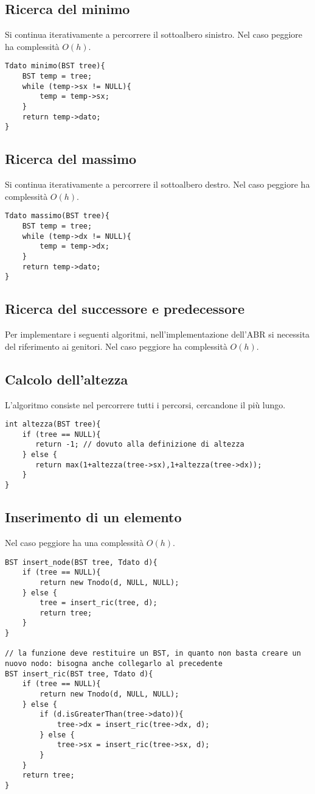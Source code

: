\subsection{Ricerca del minimo}
Si continua iterativamente a percorrere il sottoalbero sinistro. Nel caso peggiore ha complessità $O(h)$.
\begin{lstlisting}[title={Ricerca del minimo in un ABR}]
Tdato minimo(BST tree){
    BST temp = tree;
    while (temp->sx != NULL){
        temp = temp->sx;
    }
    return temp->dato;
}
\end{lstlisting}

\subsection{Ricerca del massimo}
Si continua iterativamente a percorrere il sottoalbero destro. Nel caso peggiore ha complessità $O(h)$.
\begin{lstlisting}[title={Ricerca del massimo in un ABR}]
Tdato massimo(BST tree){
    BST temp = tree;
    while (temp->dx != NULL){
        temp = temp->dx;
    }
    return temp->dato;
}
\end{lstlisting}

\subsection{Ricerca del successore e predecessore}
Per implementare i seguenti algoritmi, nell'implementazione dell'ABR si necessita del riferimento ai genitori. Nel caso peggiore ha complessità $O(h)$.

\subsection{Calcolo dell'altezza}
L'algoritmo consiste nel percorrere tutti i percorsi, cercandone il più lungo.
\begin{lstlisting}[title={Calcolo dell'altezza in un ABR}]
int altezza(BST tree){
    if (tree == NULL){
       return -1; // dovuto alla definizione di altezza
    } else {
       return max(1+altezza(tree->sx),1+altezza(tree->dx));
    }
}
\end{lstlisting}

\subsection{Inserimento di un elemento}
Nel caso peggiore ha una complessità $O(h)$.
\begin{lstlisting}[title={Inserimento di un elemento in un ABR}]
BST insert_node(BST tree, Tdato d){
    if (tree == NULL){
        return new Tnodo(d, NULL, NULL);
    } else {
        tree = insert_ric(tree, d);
        return tree;
    }
}

// la funzione deve restituire un BST, in quanto non basta creare un nuovo nodo: bisogna anche collegarlo al precedente
BST insert_ric(BST tree, Tdato d){
    if (tree == NULL){
        return new Tnodo(d, NULL, NULL);
    } else {
        if (d.isGreaterThan(tree->dato)){
            tree->dx = insert_ric(tree->dx, d);
        } else {
            tree->sx = insert_ric(tree->sx, d);
        }
    }
    return tree;
}
\end{lstlisting}

